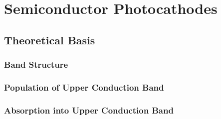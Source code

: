 
\section{Semiconductor Photocathodes}

\subsection{Theoretical Basis}

\subsubsection{Band Structure}

\subsubsection{Population of Upper Conduction Band}

\subsubsection{Absorption into Upper Conduction Band}

